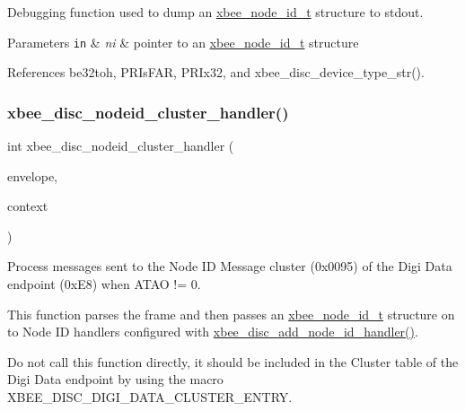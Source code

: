 Debugging function used to dump an \hyperlink{structxbee__node__id__t}{xbee\+\_\+node\+\_\+id\+\_\+t} structure to stdout. 


\begin{DoxyParams}[1]{Parameters}
\mbox{\tt in}  & {\em ni} & pointer to an \hyperlink{structxbee__node__id__t}{xbee\+\_\+node\+\_\+id\+\_\+t} structure \\
\hline
\end{DoxyParams}


References be32toh, P\+R\+Is\+F\+AR, P\+R\+Ix32, and xbee\+\_\+disc\+\_\+device\+\_\+type\+\_\+str().

\mbox{\label{group__xbee__discovery_ga20bc82e8efc243e295c99c23948bed3b}} 
\subsubsection{\texorpdfstring{xbee\+\_\+disc\+\_\+nodeid\+\_\+cluster\+\_\+handler()}{xbee\_disc\_nodeid\_cluster\_handler()}}
{\footnotesize\ttfamily int xbee\+\_\+disc\+\_\+nodeid\+\_\+cluster\+\_\+handler (\begin{DoxyParamCaption}\item[{const \hyperlink{structwpan__envelope__t}{wpan\+\_\+envelope\+\_\+t} \hyperlink{group__hal_gaef060b3456fdcc093a7210a762d5f2ed}{F\+AR} $\ast$}]{envelope,  }\item[{void \hyperlink{group__hal_gaef060b3456fdcc093a7210a762d5f2ed}{F\+AR} $\ast$}]{context }\end{DoxyParamCaption})}



Process messages sent to the Node ID Message cluster (0x0095) of the Digi Data endpoint (0x\+E8) when A\+T\+AO != 0. 

This function parses the frame and then passes an \hyperlink{structxbee__node__id__t}{xbee\+\_\+node\+\_\+id\+\_\+t} structure on to Node ID handlers configured with \hyperlink{group__xbee__discovery_ga59a0294fbcb1b9f43b8436d4ec3a5a9e}{xbee\+\_\+disc\+\_\+add\+\_\+node\+\_\+id\+\_\+handler()}.

Do not call this function directly, it should be included in the Cluster table of the Digi Data endpoint by using the macro X\+B\+E\+E\+\_\+\+D\+I\+S\+C\+\_\+\+D\+I\+G\+I\+\_\+\+D\+A\+T\+A\+\_\+\+C\+L\+U\+S\+T\+E\+R\+\_\+\+E\+N\+T\+RY.

